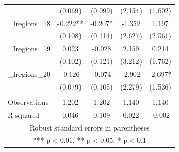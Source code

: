 \documentclass[]{article}
\begin{document}
\begin{tabular}{lcccc}
 & (0.069) & (0.099) & (2.154) & (1.602) \\
\_Iregions\_18 & -0.222** & -0.207* & -1.352 & 1.197 \\
 & (0.108) & (0.114) & (2.627) & (2.061) \\
\_Iregions\_19 & 0.023 & -0.028 & 2.159 & 0.214 \\
 & (0.102) & (0.121) & (3.212) & (1.762) \\
\_Iregions\_20 & -0.126 & -0.074 & -2.902 & -2.697* \\
 & (0.079) & (0.105) & (2.279) & (1.536) \\
 &  &  &  &  \\
Observations & 1,202 & 1,202 & 1,140 & 1,140 \\
 R-squared & 0.046 & 0.109 & 0.022 & -0.002 \\ \hline
\multicolumn{5}{c}{ Robust standard errors in parentheses} \\
\multicolumn{5}{c}{ *** p$<$0.01, ** p$<$0.05, * p$<$0.1} \\
\end{tabular}
\end{document}
